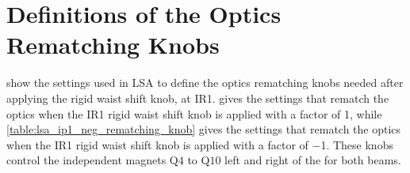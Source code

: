 
\section{Definitions of the Optics Rematching Knobs}
\label{section:optics_rematching_knobs_lsa}

 show the settings used in LSA to define the optics rematching knobs needed after applying the rigid waist shift knob, at IR\num{1}.
 gives the settings that rematch the optics when the IR\num{1} rigid waist shift knob is applied with a factor of \num{1}, while \cref{table:lsa_ip1_neg_rematching_knob} gives the settings that rematch the optics when the IR\num{1} rigid waist shift knob is applied with a factor of \num{-1}.
These knobs control the independent magnets \(\mathrm{Q4}\) to \(\mathrm{Q10}\) left and right of the \IP for both beams.

